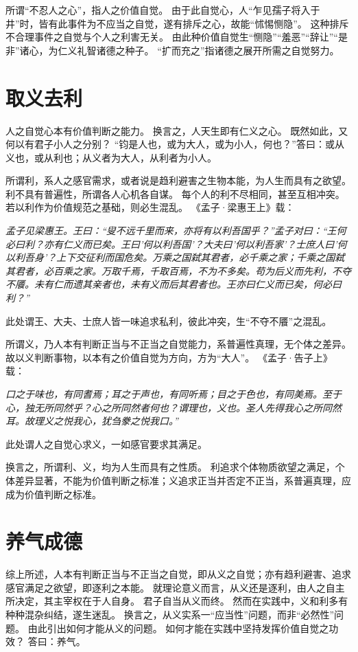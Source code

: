 \documentclass[11pt]{article}
\begin{document}
所谓“不忍人之心”，指人之价值自觉。
由于此自觉心，人“乍见孺子将入于井”时，皆有此事件为不应当之自觉，遂有排斥之心，故能“怵惕恻隐”。
这种排斥不合理事件之自觉与个人之利害无关。
由此种价值自觉生“恻隐”“羞恶”“辞让”“是非”诸心，为仁义礼智诸德之种子。
“扩而充之”指诸德之展开所需之自觉努力。

\section{取义去利}
人之自觉心本有价值判断之能力。
换言之，人天生即有仁义之心。
既然如此，又何以有君子小人之分别？
“钧是人也，或为大人，或为小人，何也？”答曰：或从义也，或从利也；从义者为大人，从利者为小人。

\par

所谓利，系人之感官需求，或者说是趋利避害之生物本能，为人生而具有之欲望。
利不具有普遍性，所谓各人心机各自谋。
每个人的利不尽相同，甚至互相冲突。
若以利作为价值规范之基础，则必生混乱。
《孟子·梁惠王上》载：

\textit{孟子见梁惠王。王曰：“叟不远千里而来，亦将有以利吾国乎？”孟子对曰：“王何必曰利？亦有仁义而已矣。王曰’何以利吾国’？大夫曰’何以利吾家’？士庶人曰’何以利吾身’？上下交征利而国危矣。万乘之国弑其君者，必千乘之家；千乘之国弑其君者，必百乘之家。万取千焉，千取百焉，不为不多矣。苟为后义而先利，不夺不餍。未有仁而遗其亲者也，未有义而后其君者也。王亦曰仁义而已矣，何必曰利？”}

此处谓王、大夫、士庶人皆一味追求私利，彼此冲突，生“不夺不餍”之混乱。

\par

所谓义，乃人本有判断正当与不正当之自觉能力，系普遍性真理，无个体之差异。
故以义判断事物，以本有之价值自觉为方向，方为“大人”。
《孟子·告子上》载：

\textit{口之于味也，有同耆焉；耳之于声也，有同听焉；目之于色也，有同美焉。至于心，独无所同然乎？心之所同然者何也？谓理也，义也。圣人先得我心之所同然耳。故理义之悦我心，犹刍豢之悦我口。”}

此处谓人之自觉心求义，一如感官要求其满足。

\par

换言之，所谓利、义，均为人生而具有之性质。
利追求个体物质欲望之满足，个体差异显著，不能为价值判断之标准；义追求正当并否定不正当，系普遍真理，应成为价值判断之标准。
  
\section{养气成德}
综上所述，人本有判断正当与不正当之自觉，即从义之自觉；亦有趋利避害、追求感官满足之欲望，即逐利之本能。
就理论意义而言，从义还是逐利，由人之自主所决定，其主宰权在于人自身。
君子自当从义而终。
然而在实践中，义和利多有种种混杂纠结，遂生迷乱。
换言之，从义实系一“应当性”问题，而非“必然性”问题。
由此引出如何才能从义的问题。
如何才能在实践中坚持发挥价值自觉之功效？
答曰：养气。
\end{document}
